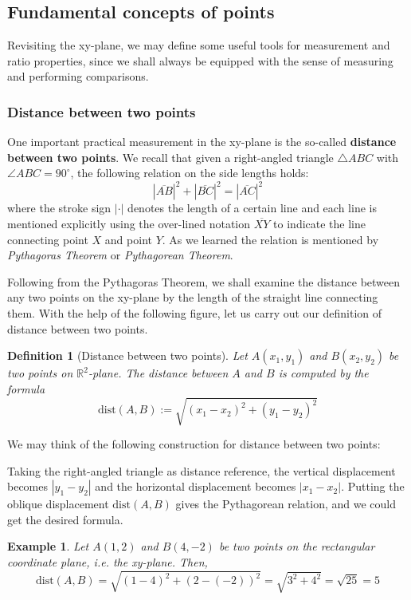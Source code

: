\documentclass[12pt]{article}
\newtheorem{definition}{Definition}[section]
\newtheorem*{example}{Example}
\begin{document}
    \subsection{Fundamental concepts of points}

    Revisiting the xy-plane, we may define some useful tools for measurement and ratio properties, since we shall always be equipped with the sense of measuring and performing comparisons.

    \subsubsection*{Distance between two points}

    One important practical measurement in the xy-plane is the so-called \textbf{distance between two points}. We recall that given a right-angled triangle $\triangle ABC$ with $\angle ABC = 90^\circ$, the following relation on the side lengths holds: $$|\overline{AB}|^2+|\overline{BC}|^2=|\overline{AC}|^2$$ where the stroke sign $|\cdot|$ denotes the length of a certain line and each line is mentioned explicitly using the over-lined notation $\overline{XY}$ to indicate the line connecting point $X$ and point $Y$. As we learned the relation is mentioned by \textit{Pythagoras Theorem} or \textit{Pythagorean Theorem}.
    
    Following from the Pythagoras Theorem, we shall examine the distance between any two points on the xy-plane by the length of the straight line connecting them. With the help of the following figure, let us carry out our definition of distance between two points.

    \begin{definition}[Distance between two points]
        Let $A(x_1,y_1)$ and $B(x_2,y_2)$ be two points on $\mathbb{R}^2$-plane. The distance between $A$ and $B$ is computed by the formula $$\mathrm{dist}(A,B):=\sqrt{(x_1-x_2)^2+(y_1-y_2)^2}$$
    \end{definition}

    We may think of the following construction for distance between two points:

    Taking the right-angled triangle as distance reference, the vertical displacement becomes $|y_1-y_2|$ and the horizontal displacement becomes $|x_1-x_2|$. Putting the oblique displacement $\mathrm{dist}(A,B)$ gives the Pythagorean relation, and we could get the desired formula.

    \begin{example}
        Let $A(1,2)$ and $B(4,-2)$ be two points on the rectangular coordinate plane, i.e. the xy-plane. Then, $$\mathrm{dist}(A,B)=\sqrt{(1-4)^2+(2-(-2))^2}=\sqrt{3^2+4^2}=\sqrt{25}=5$$
    \end{example}
\end{document}
